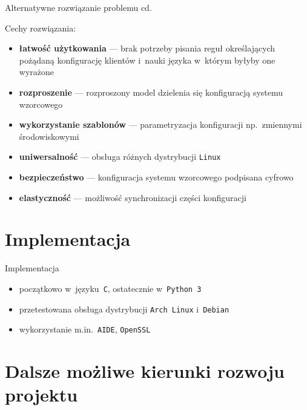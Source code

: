 \documentclass[notes,polish,xcolor=dvipsnames,aspectratio=169]{beamer}
\begin{document}
\begin{frame}{Alternatywne rozwiązanie problemu cd.}

Cechy rozwiązania:
\begin{itemize}
	\item \textbf{łatwość użytkowania} --- brak potrzeby pisania reguł określających pożądaną konfigurację klientów i~nauki języka w~którym byłyby one wyrażone
	\item \textbf{rozproszenie} --- rozproszony model dzielenia się konfiguracją systemu wzorcowego
	\item \textbf{wykorzystanie szablonów} --- parametryzacja konfiguracji np.~zmiennymi środowiskowymi
	\item \textbf{uniwersalność} --- obsługa różnych dystrybucji \texttt{Linux}
	\item \textbf{bezpieczeństwo} --- konfiguracja systemu wzorcowego podpisana cyfrowo
	\item \textbf{elastyczność} --- możliwość synchronizacji części konfiguracji
\end{itemize}

\end{frame}


\section{Implementacja}

\begin{frame}{Implementacja}

\begin{itemize}
	\item początkowo w~języku~\texttt{C}, ostatecznie w~\texttt{Python~3}
	\item przetestowana obsługa dystrybucji \texttt{Arch Linux} i~\texttt{Debian}
	\item wykorzystanie m.in.~\texttt{AIDE}, \texttt{OpenSSL}
\end{itemize}

\end{frame}


\section{Dalsze możliwe kierunki rozwoju projektu}
\end{document}
